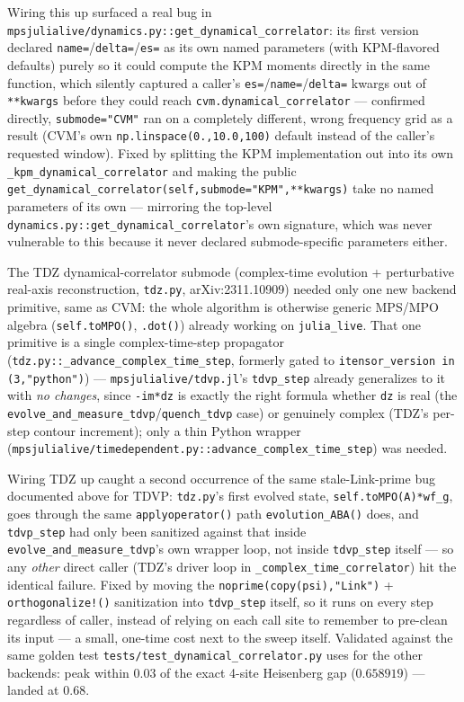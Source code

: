 \documentclass[11pt]{article}
\begin{document}
Wiring this up surfaced a real bug in
\texttt{mpsjulialive/dynamics.py::get\_dynamical\_correlator}: its first
version declared \texttt{name=}/\texttt{delta=}/\texttt{es=} as its own
named parameters (with KPM-flavored defaults) purely so it could compute
the KPM moments directly in the same function, which silently captured a
caller's \texttt{es=}/\texttt{name=}/\texttt{delta=} kwargs out of
\texttt{**kwargs} before they could reach
\texttt{cvm.dynamical\_correlator} --- confirmed directly,
\texttt{submode="CVM"} ran on a completely different, wrong frequency
grid as a result (CVM's own \texttt{np.linspace(0.,10.0,100)} default
instead of the caller's requested window). Fixed by splitting the KPM
implementation out into its own \texttt{\_kpm\_dynamical\_correlator}
and making the public
\texttt{get\_dynamical\_correlator(self,submode="KPM",**kwargs)} take no
named parameters of its own --- mirroring the top-level
\texttt{dynamics.py::get\_dynamical\_correlator}'s own signature, which
was never vulnerable to this because it never declared submode-specific
parameters either.

The TDZ dynamical-correlator submode (complex-time evolution + perturbative
real-axis reconstruction, \texttt{tdz.py}, arXiv:2311.10909) needed only
one new backend primitive, same as CVM: the whole algorithm is otherwise
generic MPS/MPO algebra (\texttt{self.toMPO()}, \texttt{.dot()}) already
working on \texttt{julia\_live}. That one primitive is a single
complex-time-step propagator
(\texttt{tdz.py::\_advance\_complex\_time\_step}, formerly gated to
\texttt{itensor\_version in (3,"python")}) ---
\texttt{mpsjulialive/tdvp.jl}'s \texttt{tdvp\_step} already generalizes
to it with \emph{no changes}, since \texttt{-im*dz} is exactly the right
formula whether \texttt{dz} is real (the
\texttt{evolve\_and\_measure\_tdvp}/\texttt{quench\_tdvp} case) or
genuinely complex (TDZ's per-step contour increment); only a thin Python
wrapper
(\texttt{mpsjulialive/timedependent.py::advance\_complex\_time\_step})
was needed.

Wiring TDZ up caught a second occurrence of the same stale-Link-prime bug
documented above for TDVP: \texttt{tdz.py}'s first evolved state,
\texttt{self.toMPO(A)*wf\_g}, goes through the same
\texttt{applyoperator()} path \texttt{evolution\_ABA()} does, and
\texttt{tdvp\_step} had only been sanitized against that inside
\texttt{evolve\_and\_measure\_tdvp}'s own wrapper loop, not inside
\texttt{tdvp\_step} itself --- so any \emph{other} direct caller (TDZ's
driver loop in \texttt{\_complex\_time\_correlator}) hit the identical
failure. Fixed by moving the \texttt{noprime(copy(psi),"Link")} +
\texttt{orthogonalize!()} sanitization into \texttt{tdvp\_step} itself,
so it runs on every step regardless of caller, instead of relying on
each call site to remember to pre-clean its input --- a small, one-time
cost next to the sweep itself. Validated against the same golden test
\texttt{tests/test\_dynamical\_correlator.py} uses for the other
backends: peak within $0.03$ of the exact 4-site Heisenberg gap
($0.658919$) --- landed at $0.68$.
\end{document}
